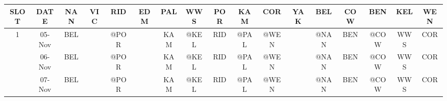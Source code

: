 \begin{table}[htbp]
  \centering
  \tiny
  \tabcolsep=0.005cm
    \begin{tabular}{ccrrrrrrrrrrrrrrr}
    \toprule
    \multicolumn{1}{|c|}{\textbf{SLOT}} & \multicolumn{1}{c|}{\textbf{DATE}} & \multicolumn{1}{c|}{\cellcolor[rgb]{ .8,  1,  .8}\textbf{NAN}} & \multicolumn{1}{c|}{\cellcolor[rgb]{ .8,  1,  .8}\textbf{VIC}} & \multicolumn{1}{c|}{\cellcolor[rgb]{ .8,  1,  .8}\textbf{RID}} & \multicolumn{1}{c|}{\cellcolor[rgb]{ .8,  1,  .8}\textbf{EDM}} & \multicolumn{1}{c|}{\cellcolor[rgb]{ .8,  1,  .8}\textbf{PAL}} & \multicolumn{1}{c|}{\cellcolor[rgb]{ .8,  1,  .8}\textbf{WWS}} & \multicolumn{1}{c|}{\cellcolor[rgb]{ .8,  1,  .8}\textbf{POR}} & \multicolumn{1}{c|}{\cellcolor[rgb]{ .8,  1,  .8}\textbf{KAM}} & \multicolumn{1}{c|}{\cellcolor[rgb]{ .8,  1,  .8}\textbf{COR}} & \multicolumn{1}{c|}{\cellcolor[rgb]{ .8,  1,  .8}\textbf{YAK}} & \multicolumn{1}{c|}{\cellcolor[rgb]{ .8,  1,  .8}\textbf{BEL}} & \multicolumn{1}{c|}{\cellcolor[rgb]{ .8,  1,  .8}\textbf{COW}} & \multicolumn{1}{c|}{\cellcolor[rgb]{ .8,  1,  .8}\textbf{BEN}} & \multicolumn{1}{c|}{\cellcolor[rgb]{ .8,  1,  .8}\textbf{KEL}} & \multicolumn{1}{c|}{\cellcolor[rgb]{ .8,  1,  .8}\textbf{WEN}} \\
    \midrule
    1     & 05-Nov & \multicolumn{1}{c}{BEL} &       & \multicolumn{1}{c}{@POR} &       & \multicolumn{1}{c}{KAM} & \multicolumn{1}{c}{\cellcolor[rgb]{ .588,  .588,  .588}@KEL} & \multicolumn{1}{c}{RID} & \multicolumn{1}{c}{@PAL} & \multicolumn{1}{c}{\cellcolor[rgb]{ .588,  .588,  .588}@WEN} &       & \multicolumn{1}{c}{@NAN} & \multicolumn{1}{c}{BEN} & \multicolumn{1}{c}{@COW} & \multicolumn{1}{c}{WWS} & \multicolumn{1}{c}{COR} \\
          & 06-Nov & \multicolumn{1}{c}{BEL} &       & \multicolumn{1}{c}{@POR} &       & \multicolumn{1}{c}{KAM} & \multicolumn{1}{c}{\cellcolor[rgb]{ .588,  .588,  .588}@KEL} & \multicolumn{1}{c}{RID} & \multicolumn{1}{c}{@PAL} & \multicolumn{1}{c}{\cellcolor[rgb]{ .588,  .588,  .588}@WEN} &       & \multicolumn{1}{c}{@NAN} & \multicolumn{1}{c}{BEN} & \multicolumn{1}{c}{@COW} & \multicolumn{1}{c}{WWS} & \multicolumn{1}{c}{COR} \\
          & 07-Nov & \multicolumn{1}{c}{BEL} &       & \multicolumn{1}{c}{@POR} &       & \multicolumn{1}{c}{KAM} & \multicolumn{1}{c}{\cellcolor[rgb]{ .588,  .588,  .588}@KEL} & \multicolumn{1}{c}{RID} & \multicolumn{1}{c}{@PAL} & \multicolumn{1}{c}{\cellcolor[rgb]{ .588,  .588,  .588}@WEN} &       & \multicolumn{1}{c}{@NAN} & \multicolumn{1}{c}{BEN} & \multicolumn{1}{c}{@COW} & \multicolumn{1}{c}{WWS} & \multicolumn{1}{c}{COR} \\

\end{tabular}
\end{table}
